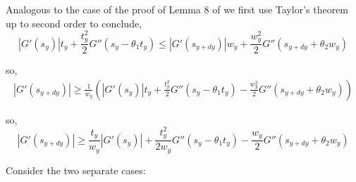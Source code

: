 \documentclass{article}
\theoremstyle{plain}
\theoremstyle{definition}
\theoremstyle{plain}
\begin{document}
Analogous to the case of the proof of Lemma 8 of\cite{Pat25} we first use Taylor's theorem up to second order to conclude,
\begin{equation}
|G'(s_y)| t_y + \frac{t_y^2}{2} G''(s_y - \theta_1 t_y) \le |G'(s_{y+dy})| w_y + \frac{w_y^2}{2} G''(s_{y+dy} + \theta_2 w_y)
\end{equation}

so, \begin{align}|G'(s_{y+dy})| \ge \frac{1}{w_y} \left( |G'(s_y)| t_y + \frac{t_y^2}{2} G''(s_y - \theta_1 t_y) - \frac{w_y^2}{2} G''(s_{y+dy} + \theta_2 w_y) \right)\end{align}

so, \begin{equation} \label{12}
|G'(s_{y+dy})| \ge \frac{t_y}{w_y} |G'(s_y)| + \frac{t_y^2}{2w_y} G''(s_y - \theta_1 t_y) - \frac{w_y}{2} G''(s_{y+dy} + \theta_2 w_y)
\end{equation}

Consider the two separate cases:
\end{document}
